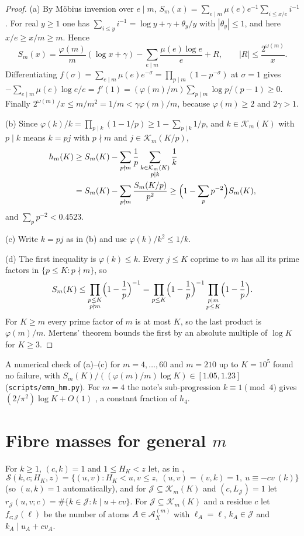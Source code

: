 \documentclass[10pt,reqno]{amsart}
\theoremstyle{definition}
\newcommand{\K}{\mathcal K}
\newcommand{\J}{\mathcal J}
\newcommand{\A}{\mathcal A}
\newcommand{\Sset}{\mathcal S}
\begin{document}
\begin{proof}
(a) By M\"obius inversion over $e\mid m$,
$S_m(x)=\sum_{e\mid m}\mu(e)e^{-1}\sum_{i\leq x/e}i^{-1}$.  For real
$y\geq1$ one has $\sum_{i\leq y}i^{-1}=\log y+\gamma+\theta_y/y$ with
$|\theta_y|\leq1$, and here $x/e\geq x/m\geq m$.  Hence
\[
 S_m(x)=\frac{\varphi(m)}m(\log x+\gamma)
  -\sum_{e\mid m}\frac{\mu(e)\log e}e+R,\qquad|R|\leq\frac{2^{\omega(m)}}x.
\]
Differentiating $f(\sigma)=\sum_{e\mid m}\mu(e)e^{-\sigma}=\prod_{p\mid m}(1-p^{-\sigma})$
at $\sigma=1$ gives
$-\sum_{e\mid m}\mu(e)\log e/e=f'(1)=(\varphi(m)/m)\sum_{p\mid m}\log p/(p-1)\geq0$.
Finally $2^{\omega(m)}/x\leq m/m^2=1/m<\gamma\varphi(m)/m$, because
$\varphi(m)\geq2$ and $2\gamma>1$.

(b) Since $\varphi(k)/k=\prod_{p\mid k}(1-1/p)\geq1-\sum_{p\mid k}1/p$,
and $k\in\K_m(K)$ with $p\mid k$ means $k=pj$ with $p\nmid m$ and
$j\in\K_m(K/p)$,
\[
 \begin{aligned}
 h_m(K)&\geq S_m(K)-\sum_{p\nmid m}\frac1p\sum_{\substack{k\in\K_m(K)\\p\mid k}}\frac1k\\
 &=S_m(K)-\sum_{p\nmid m}\frac{S_m(K/p)}{p^2}
 \geq\Bigl(1-\sum_pp^{-2}\Bigr)S_m(K),
 \end{aligned}
\]
and $\sum_pp^{-2}<0.4523$.

(c) Write $k=pj$ as in (b) and use $\varphi(k)/k^2\leq1/k$.

(d) The first inequality is $\varphi(k)\leq k$.  Every $j\leq K$ coprime to
$m$ has all its prime factors in $\{p\leq K:p\nmid m\}$, so
\[
 S_m(K)\leq\prod_{\substack{p\leq K\\p\nmid m}}\Bigl(1-\frac1p\Bigr)^{-1}
 =\prod_{p\leq K}\Bigl(1-\frac1p\Bigr)^{-1}\prod_{\substack{p\mid m\\p\leq K}}\Bigl(1-\frac1p\Bigr).
\]
For $K\geq m$ every prime factor of $m$ is at most $K$, so the last
product is $\varphi(m)/m$.  Mertens' theorem bounds the first by an
absolute multiple of $\log K$ for $K\geq3$.
\end{proof}

A numerical check of (a)--(c) for $m=4,\ldots,60$ and $m=210$ up to
$K=10^5$ found no failure, with
$S_m(K)/((\varphi(m)/m)\log K)\in[1.05,1.23]$
(\texttt{scripts/emn\_hm.py}).  For $m=4$ the note's sub-progression
$k\equiv1\pmod 4$ gives $(2/\pi^2)\log K+O(1)$ \cite[Lemma~3.2]{TQ}, a
constant fraction of $h_4$.

\section{\texorpdfstring{Fibre masses for general $m$}{Fibre masses for general m}}\label{sec:fibre}
For $k\geq1$, $(c,k)=1$ and $1\leq H_K<z$ let, as in \cite[\S3]{TQ},
\[
 \Sset(k,c;H_K,z)=\{(u,v):H_K<u,v\leq z,\ (u,v)=(v,k)=1,\
 u\equiv-cv\ (k)\}
\]
(so $(u,k)=1$ automatically), and for $\J\subseteq\K_m(K)$ and
$(c,L_{\J})=1$ let $r_{\J}(u,v;c)=\#\{k\in\J:k\mid u+cv\}$.
For $\J\subseteq\K_m(K)$ and a residue $c$ let $f_{c;\J}(\ell)$ be the
number of atoms $A\in\A^{(m)}_X$ with $\ell_A=\ell$, $k_A\in\J$ and
$k_A\mid u_A+cv_A$.
\end{document}
